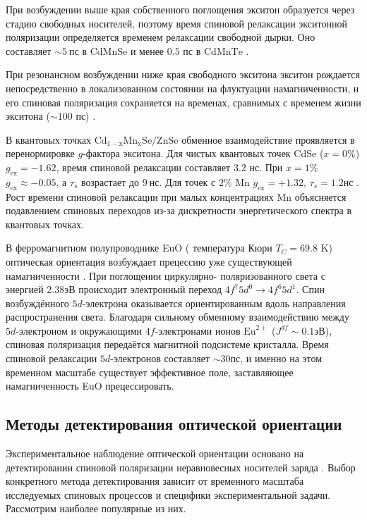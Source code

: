 \documentclass[14pt]{extarticle}
\numberwithin{equation}{section}
\begin{document}
При возбуждении выше края собственного поглощения экситон образуется
через стадию свободных носителей, поэтому время спиновой релаксации
экситонной поляризации определяется временем релаксации свободной
дырки. Оно составляет $\sim 5~\text{пс}$ в $\mathrm{CdMnSe}$ и менее
$0.5$ пс в $\mathrm{CdMnTe}$ \cite{WARNOCK1985}.

При резонансном возбуждении ниже края свободного экситона экситон
рождается непосредственно в локализованном состоянии на флуктуации
намагниченности, и его спиновая поляризация сохраняется на временах,
сравнимых с временем жизни экситона ($\sim 100$ пс) \cite{WARNOCK1985}.

В квантовых точках $\mathrm{Cd_{1-x}Mn_xSe/ZnSe}$ обменное
взаимодействие проявляется в перенормировке $g$-фактора экситона.
Для чистых квантовых точек CdSe ($x = 0\%$) $g_{\text{ex}} = -1.62$,
время спиновой релаксации составляет $3.2$ нс. При
$x = 1\%$ $g_{\text{ex}} \approx -0.05$, а $\tau_s$ возрастает
до $9~\text{нс}$. Для точек с $2\%$ Mn $g_{\text{ex}} = +1.32$,
$\tau_s = 1.2 \text{нс}$ \cite{schmidt2006}. Рост времени спиновой
релаксации при малых концентрациях Mn объясняется подавлением спиновых
переходов из-за дискретности энергетического спектра в квантовых точках.

В ферромагнитном полупроводнике EuO ( температура Кюри $T_C = 69.8$ K) оптическая
ориентация возбуждает прецессию уже существующей
намагниченности \cite{Usachev}. При поглощении циркулярно-
поляризованного света с энергией $2.38 \text{эВ}$ происходит
электронный переход $4f^7 5d^0 \rightarrow 4f^6 5d^1$. Спин
возбуждённого $5d$-электрона оказывается ориентированным вдоль
направления распространения света. Благодаря сильному обменному
взаимодействию между $5d$-электроном и окружающими $4f$-электронами
ионов $\mathrm{Eu}^{2+}$ ($J^{df} \sim 0.1 \text{эВ}$), спиновая
поляризация передаётся магнитной подсистеме кристалла. Время спиновой
релаксации $5d$-электронов составляет $\sim 30 \text{пс}$, и именно
на этом временном масштабе существует эффективное поле, заставляющее
намагниченность EuO прецессировать.

\subsection{Методы детектирования оптической ориентации}

Экспериментальное наблюдение оптической ориентации основано на детектировании спиновой поляризации неравновесных носителей заряда \cite{zakharchenya_opt_or}. Выбор конкретного метода детектирования зависит от временного масштаба исследуемых спиновых процессов и специфики экспериментальной задачи. Рассмотрим наиболее популярные из них.
\end{document}
